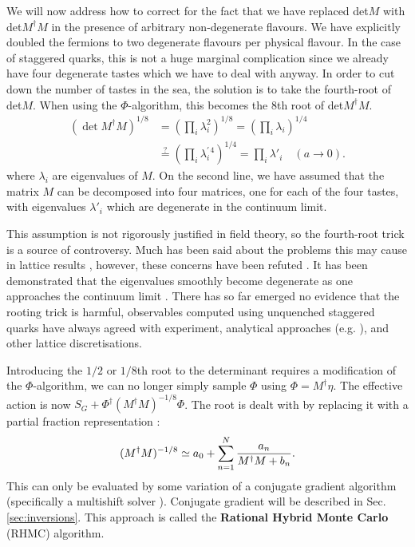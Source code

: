 We will now address how to correct for the fact that we have replaced det$M$ with det$M^{\dagger}M$ in the presence of arbitrary non-degenerate flavours. We have explicitly doubled the fermions to two degenerate flavours per physical flavour. In the case of staggered quarks, this is not a huge marginal complication since we already have four degenerate tastes which we have to deal with anyway. In order to cut down the number of tastes in the sea, the solution is to take the fourth-root of det$M$. When using the $\Phi$-algorithm, this becomes the 8th root of det$M^{\dagger}M$.
\begin{align}
  (\det M^{\dagger} M )^{1/8} &= (\prod_i \lambda_i^2)^{1/8} = (\prod_i \lambda_i)^{1/4} \\ \nonumber &\stackrel{?}{=} (\prod_i\lambda_i^{'\,4})^{1/4} = \prod_i \lambda'_i \quad (a\to 0).
\end{align}
where $\lambda_i$ are eigenvalues of $M$. On the second line, we have assumed that the matrix $M$ can be decomposed into four matrices, one for each of the four tastes, with eigenvalues $\lambda'_i$ which are degenerate in the continuum limit.

This assumption is not rigorously justified in field theory, so the fourth-root trick is a source of controversy. Much has been said about the problems this may cause in lattice results \cite{JANSEN20043,CREUTZ2007230,Creutz:2007rk}, however, these concerns have been refuted \cite{Kronfeld:2007ek,Sharpe:2006re}. It has been demonstrated that the eigenvalues smoothly become degenerate as one approaches the continuum limit \cite{Follana:2004sz,Donald:2011if}.
There has so far emerged no evidence that the rooting trick is harmful, observables computed using unquenched staggered quarks have always agreed with experiment, analytical approaches (e.g. \cite{Durr:2012te}), and other lattice discretisations. 

Introducing the $1/2$ or $1/8$th root to the determinant requires a modification of the $\Phi$-algorithm, we can no longer simply sample $\Phi$ using $\Phi=M^{\dagger}\eta$. The effective action is now $S_G + \Phi^{\dagger} (M^{\dagger}M)^{-1/8} \Phi$. The root is dealt with by replacing it with a partial fraction representation \cite{Clark:2006fx}:
\begin{align}
  (M^{\dagger}M)^{-1/8} \simeq a_0 + \sum_{n=1}^N { a_n \over M^{\dagger}M + b_n }.
  \label{eq:rational}
\end{align}
This can only be evaluated by some variation of a conjugate gradient algorithm (specifically a multishift solver \cite{Frommer:1995ik,Jegerlehner:1996pm}). Conjugate gradient will be described in Sec. \ref{sec:inversions}. This approach is called the {\bf{Rational Hybrid Monte Carlo}} (RHMC) algorithm.

